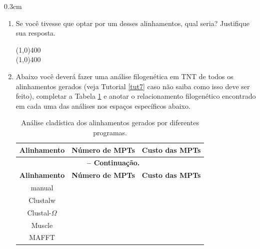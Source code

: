 \begin{refsection}
\begin {myindentpar}{0.3cm}
\begin{enumerate}[\itshape i.]
\item{Se você tivesse que optar por um desses alinhamentos, qual seria? Justifique sua resposta.}

\line(1,0){400}\\
\line(1,0){400}\\

\item{Abaixo você deverá fazer uma análise filogenética em TNT de todos os alinhamentos gerados (veja Tutorial \ref{tut7} caso não saiba como isso deve ser feito), completar a Tabela \ref{tut8:table:align} e anotar o relacionamento filogenético encontrado em cada uma das análises nos espaços específicos abaixo.}


\pagestyle{fancy}
\begin{center}

\begin{longtable}{|c|c|c|}
\caption[Análise cladística de vários alinhamentos]{Análise cladística dos alinhamentos gerados por diferentes programas.} \label{tut8:table:align} \\


\hline\hline \textbf{Alinhamento} & \textbf{Número de MPTs}  & \textbf{Custo das MPTs}\\
\endfirsthead

\multicolumn{3}{c}{{\bfseries \tablename\ \thetable{} -- Continuação.}}\\
\hline\hline \textbf{Alinhamento} & \textbf{Número de MPTs} & \textbf{Custo das MPTs}\\
\endhead
\hline \hline
\endlastfoot

\hline manual &  & \\
\hline Clustalw &  & \\
\hline Clustal-$\Omega$ &  & \\
\hline Muscle &  & \\
\hline MAFFT &  & \\

\end{longtable}
\end{center}


\end{enumerate}
\end{myindentpar}
\end{refsection}
